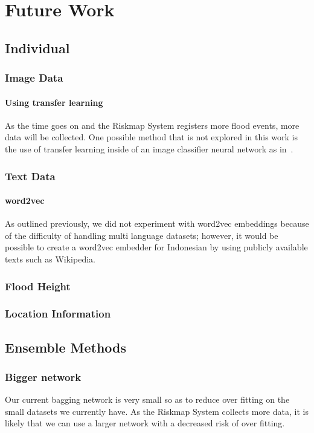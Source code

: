 \chapter{Future Work}

\section{Individual}
\subsection{Image Data}
\subsubsection{Using transfer learning}
As the time goes on and the Riskmap System registers more flood events, 
more data will be collected. One possible method that is not explored in this
work is the use of transfer learning inside of an image classifier neural
network as in~\cite{donahueDeCAFDeepConvolutional2013}.
\subsection{Text Data}
\subsubsection{word2vec}
As outlined previously, we did not experiment with word2vec embeddings because
of the difficulty of handling multi language datasets; however, it would be
possible to create a word2vec embedder for Indonesian by using publicly
available texts such as Wikipedia.
\subsection{Flood Height}
\subsection{Location Information}
\subsubsection{}

\section{Ensemble Methods}
\subsection{Bigger network}
Our current bagging network is very small so as to reduce over fitting on the
small datasets we currently have. As the Riskmap System collects more data, it
is likely that we can use a larger network with a decreased risk of over fitting.
